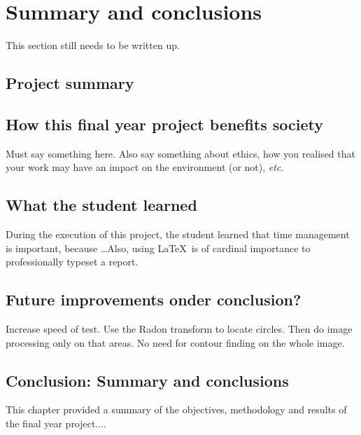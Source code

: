\def\baselinestretch{1}
\chapter{Summary and conclusions}
\label{ch:Conclusions}

\graphicspath{{Conclusions/Figures_Conclusions/}}

This section still needs to be written up.

\section{Project summary}

\section{How this final year project benefits society}
Must say something here. Also say something about ethics, how you realised that your work may have an impact on the environment (or not), \textit{etc}.

\section{What the student learned}
During the execution of this project, the student learned that time management is important, because \ldots Also, using \LaTeX \ is of cardinal importance to professionally typeset a report.


\section{Future improvements onder conclusion?}

Increase speed of test. Use the Radon transform to locate circles. Then do image processing only on that areas. No need for contour finding on the whole image.

\section{Conclusion: Summary and conclusions}

This chapter provided a summary of the objectives, methodology and results of the final year project....
